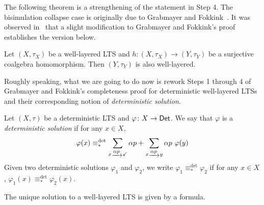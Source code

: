\documentclass[orivec,envcountsect,envcountsame]{llncs}
\begin{document}
The following theorem is a strengthening of the statement in Step 4.
The bisimulation collapse case is originally due to Grabmayer and Fokkink~\cite{regexlics}.
It was observed in~\cite[Theorem 4.1]{starmfps} that a slight modification to Grabmayer and Fokkink's proof establishes the version below.

\begin{theorem}\label{thm:closure under homomorphic images}
	Let \((X, \tau_X)\) be a well-layered LTS and \(h\colon (X, \tau_X) \to (Y, \tau_Y)\) be a surjective coalgebra homomorphism.
	Then \((Y, \tau_Y)\) is also well-layered.
\end{theorem}

Roughly speaking, what we are going to do now is rework Steps 1 through 4 of Grabmayer and Fokkink's completeness proof for deterministic well-layered LTSs and their corresponding notion of \emph{deterministic solution}.

\begin{definition}
	Let \((X,\tau)\) be a deterministic LTS and \(\varphi \colon X \to \mathsf{Det}\).
	We say that \(\varphi\) is a \emph{deterministic solution} if for any \(x \in X\),
	\[
	\varphi(x) \equiv_*^{\det} \sum_{x \tr{\alpha p} \checkmark} \alpha p + \sum_{x \tr{\alpha p} y} \alpha p~\varphi(y)
	\]
	Given two deterministic solutions \(\varphi_1\) and \(\varphi_2\), we write \(\varphi_1 \equiv_*^{\det} \varphi_2\) if for any \(x \in X\), \(\varphi_1(x) \equiv_*^{\det} \varphi_2(x)\).
\end{definition}

The unique solution to a well-layered LTS is given by a formula.
\end{document}
